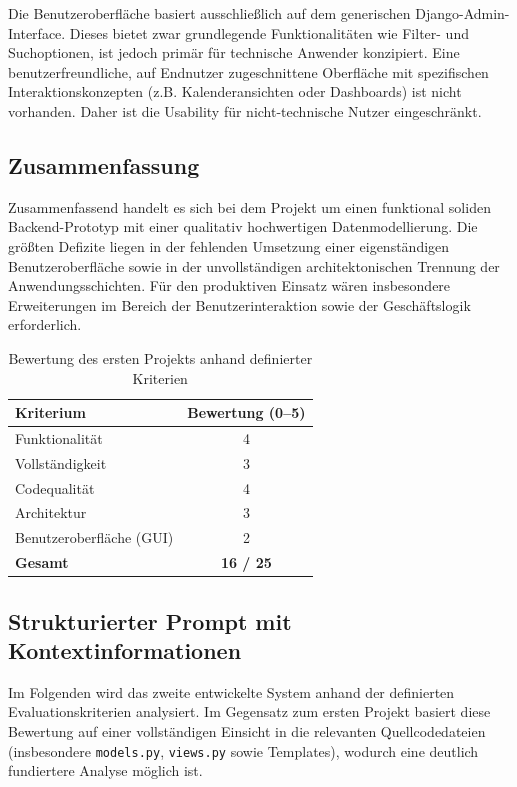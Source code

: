 Die Benutzeroberfläche basiert ausschließlich auf dem generischen Django-Admin-Interface. Dieses bietet zwar grundlegende Funktionalitäten wie Filter- und Suchoptionen, ist jedoch primär für technische Anwender konzipiert. Eine benutzerfreundliche, auf Endnutzer zugeschnittene Oberfläche mit spezifischen Interaktionskonzepten (z.B. Kalenderansichten oder Dashboards) ist nicht vorhanden. Daher ist die Usability für nicht-technische Nutzer eingeschränkt.

\subsection{Zusammenfassung}

Zusammenfassend handelt es sich bei dem Projekt um einen funktional soliden Backend-Prototyp mit einer qualitativ hochwertigen Datenmodellierung. Die größten Defizite liegen in der fehlenden Umsetzung einer eigenständigen Benutzeroberfläche sowie in der unvollständigen architektonischen Trennung der Anwendungsschichten. Für den produktiven Einsatz wären insbesondere Erweiterungen im Bereich der Benutzerinteraktion sowie der Geschäftslogik erforderlich.

\begin{table}[h]
\centering
\caption{Bewertung des ersten Projekts anhand definierter Kriterien}
\begin{tabular}{l c}
\hline
\textbf{Kriterium} & \textbf{Bewertung (0--5)} \\
\hline
Funktionalität & 4 \\
Vollständigkeit & 3 \\
Codequalität & 4 \\
Architektur & 3 \\
Benutzeroberfläche (GUI) & 2 \\
\hline
\textbf{Gesamt} & \textbf{16 / 25} \\
\hline
\end{tabular}
\end{table}

\subsection{Strukturierter Prompt mit Kontextinformationen}

Im Folgenden wird das zweite entwickelte System anhand der definierten Evaluationskriterien analysiert. Im Gegensatz zum ersten Projekt basiert diese Bewertung auf einer vollständigen Einsicht in die relevanten Quellcodedateien (insbesondere \texttt{models.py}, \texttt{views.py} sowie Templates), wodurch eine deutlich fundiertere Analyse möglich ist.

